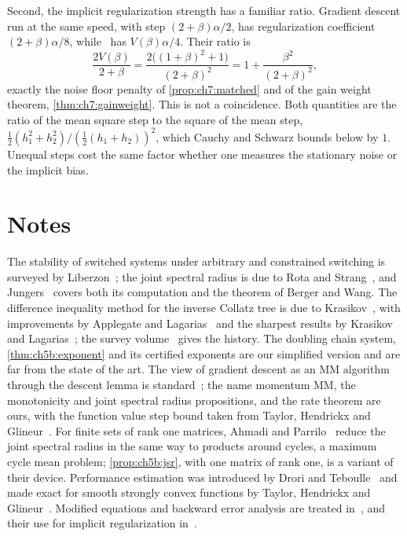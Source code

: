Second, the implicit regularization strength has a familiar ratio. Gradient
descent run at the same speed, with step $(2+\beta)\alpha/2$, has regularization
coefficient $(2+\beta)\alpha/8$, while \smmdet\ has $V(\beta)\alpha/4$. Their
ratio is
\[
  \frac{2V(\beta)}{2+\beta}=\frac{2\bigl((1+\beta)^2+1\bigr)}{(2+\beta)^2}
  =1+\frac{\beta^2}{(2+\beta)^2},
\]
exactly the noise floor penalty of \cref{prop:ch7:matched} and of the gain weight
theorem, \cref{thm:ch7:gainweight}. This is not a coincidence. Both quantities are the ratio of the mean
square step to the square of the mean step, $\frac12(h_1^2+h_2^2)/
(\frac12(h_1+h_2))^2$, which Cauchy and Schwarz bounds below by $1$. Unequal steps
cost the same factor whether one measures the stationary noise or the implicit
bias.

\section*{Notes}

The stability of switched systems under arbitrary and constrained switching
is surveyed by Liberzon~\cite{liberzon2003}; the joint spectral radius is due to
Rota and Strang~\cite{rota1960}, and Jungers~\cite{jungers2009} covers both
its computation and the theorem of Berger and Wang. The difference inequality method
for the inverse Collatz tree is due to Krasikov~\cite{krasikov1989}, with
improvements by Applegate and Lagarias~\cite{applegate1995} and the sharpest
results by Krasikov and Lagarias~\cite{krasikov2003}; the survey volume~\cite{lagarias2010}
gives the history. The doubling chain system, \cref{thm:ch5b:exponent} and its
certified exponents are our simplified version and are far from the state of
the art. The view of gradient descent as an MM algorithm through the descent
lemma is standard~\cite{lange2000,hunter2004}; the name momentum MM, the
monotonicity and joint spectral radius propositions, and the rate theorem are
ours, with the
function value step bound taken from Taylor, Hendrickx and
Glineur~\cite{taylor2018}.
For finite sets of rank one matrices, Ahmadi and Parrilo~\cite{ahmadi2012} reduce the joint spectral radius in the same way to products around cycles, a maximum cycle mean problem; \cref{prop:ch5b:jsr}, with one matrix of rank one, is a variant of their device.
Performance estimation was introduced by Drori and
Teboulle~\cite{drori2014} and made exact for smooth strongly convex functions by
Taylor, Hendrickx and Glineur~\cite{taylor2017}. Modified equations and backward
error analysis are treated in~\cite{hairer2006}, and their use for implicit
regularization in~\cite{barrett2021}.

